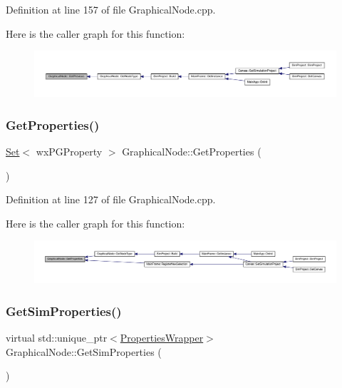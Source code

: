 Definition at line 157 of file Graphical\+Node.\+cpp.

Here is the caller graph for this function\+:
\nopagebreak
\begin{figure}[H]
\begin{center}
\leavevmode
\includegraphics[width=350pt]{class_graphical_node_a2e097f9b7b10970e20c530176a5e50b2_icgraph}
\end{center}
\end{figure}
\mbox{\label{class_graphical_node_a9d89885db9553820d3557a801a83b9de}} 
\subsubsection{\texorpdfstring{Get\+Properties()}{GetProperties()}}
{\footnotesize\ttfamily \hyperlink{class_set}{Set}$<$ wx\+P\+G\+Property $>$ Graphical\+Node\+::\+Get\+Properties (\begin{DoxyParamCaption}{ }\end{DoxyParamCaption})}



Definition at line 127 of file Graphical\+Node.\+cpp.

Here is the caller graph for this function\+:
\nopagebreak
\begin{figure}[H]
\begin{center}
\leavevmode
\includegraphics[width=350pt]{class_graphical_node_a9d89885db9553820d3557a801a83b9de_icgraph}
\end{center}
\end{figure}
\mbox{\label{class_graphical_node_a2ad6386709ceabfbf97daabf4c6cd64a}} 
\subsubsection{\texorpdfstring{Get\+Sim\+Properties()}{GetSimProperties()}}
{\footnotesize\ttfamily virtual std\+::unique\+\_\+ptr$<$\hyperlink{class_graphical_node_1_1_properties_wrapper}{Properties\+Wrapper}$>$ Graphical\+Node\+::\+Get\+Sim\+Properties (\begin{DoxyParamCaption}{ }\end{DoxyParamCaption})\hspace{0.3cm}{\ttfamily [pure virtual]}}



